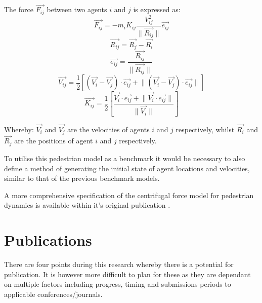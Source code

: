         The force $\vec{F_{ij}}$ between two agents $i$ and $j$ is expressed as:
        \begin{equation}\label{eq:1}
          \vec{F_{ij}} = -m_{i}K_{ij}\frac{V^{2}_{ij}}{\lVert \vec{R_{ij}}\rVert}\vec{e_{ij}}
        \end{equation}
        \begin{equation}\label{eq:2}
          \vec{R_{ij}} = \vec{R_{j}} - \vec{R_{i}}
        \end{equation}
        \begin{equation}\label{eq:3}
          \vec{e_{ij}} = \frac{\vec{R_{ij}}}{\lVert \vec{R_{ij}}\rVert}
        \end{equation}
        \begin{equation}\label{eq:4}
          \vec{V_{ij}} = \frac{1}{2}[(\vec{V_{i}}-\vec{V_{j}}) \cdot \vec{e_{ij}} + \lVert (\vec{V_{i}}-\vec{V_{j}}) \cdot \vec{e_{ij}} \rVert]
        \end{equation}
        \begin{equation}\label{eq:5}
          \vec{K_{ij}} = \frac{1}{2}\left[\frac{\vec{V_{i}} \cdot \vec{e_{ij}} + \lVert \vec{V_{i}} \cdot \vec{e_{ij}} \rVert}{\lVert \vec{V_{i}} \rVert} \right]
        \end{equation}
        
        Whereby: $\vec{V_{i}}$ and $\vec{V_{j}}$ are the velocities of agents $i$ and $j$ respectively, whilst $\vec{R_{i}}$ and $\vec{R_{j}}$ are the positions of agent $i$ and $j$ respectively.
    
        To utilise this pedestrian model as a benchmark it would be necessary to also define a method of generating the initial state of agent locations and velocities, similar to that of the previous benchmark models.
    
        A more comprehensive specification of the centrifugal force model for pedestrian dynamics is available within it's original publication \cite{YC*05}.
      
  \section{Publications}
    There are four points during this research whereby there is a potential for publication. It is however more difficult to plan for these as they are dependant on multiple factors including progress, timing and submissions periods to applicable conferences/journals.
    
